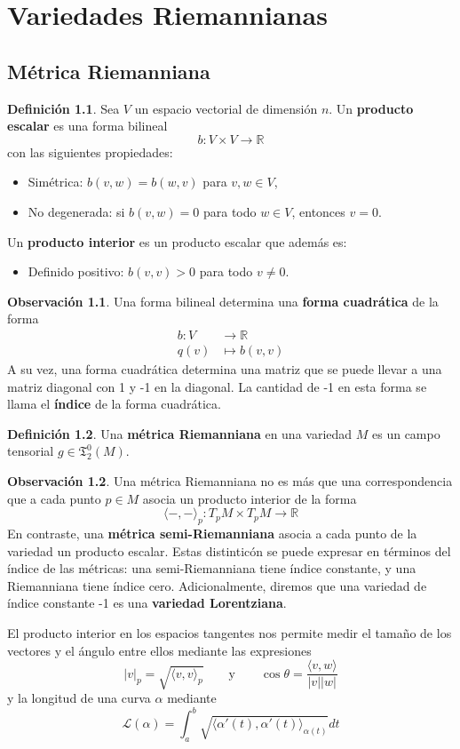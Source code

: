 \documentclass[spanish]{book}
\theoremstyle{definition}
\newtheorem*{defn}{Definición}
\newtheorem*{obs}{Observación}
\newcommand{\R}{\mathbb{R}}
\newcommand{\T}{\mathfrak{T}}
\begin{document}
	\chapter{Variedades Riemannianas}
	\section{Métrica Riemanniana}
	\begin{defn}
		Sea $V$ un espacio vectorial de dimensión $n$. Un \textbf{producto escalar} es una forma bilineal
		\[b:V\times V\to\R\]
		con las siguientes propiedades:
		\begin{itemize}
			\item Simétrica: $b(v,w)=b(w,v)$ para $v,w\in V$,
			\item No degenerada: si $b(v,w)=0$ para todo $w\in V$, entonces $v=0$.
		\end{itemize}
		Un \textbf{producto interior} es un producto escalar que además es:
		\begin{itemize}
			\item Definido positivo: $b(v,v)>0$ para todo $v\neq0$.
		\end{itemize}
	\end{defn}
	\begin{obs}
		Una forma bilineal determina una \textbf{forma cuadrática} de la forma
		\begin{align*}
			b:V&\to\R\\
			q(v)&\mapsto b(v,v)
		\end{align*}
		A su vez, una forma cuadrática determina una matriz que se puede llevar a una matriz diagonal con 1 y -1 en la diagonal. La cantidad de -1 en esta forma se llama el \textbf{índice} de la forma cuadrática.
	\end{obs}
	
	\begin{defn}
		Una \textbf{métrica Riemanniana} en una variedad $M$ es un campo tensorial $g\in\T^0_2(M)$.
	\end{defn}
	\begin{obs}
		Una métrica Riemanniana no es más que una correspondencia que a cada punto $p\in M$ asocia un producto interior de la forma
		\[\langle -,- \rangle_p:T_pM\times T_pM\to\R\]
		En contraste, una \textbf{métrica semi-Riemanniana} asocia a cada punto de la variedad un producto escalar. Estas distinticón se puede expresar en términos del índice de las métricas: una semi-Riemanniana tiene índice constante, y una Riemanniana tiene índice cero. Adicionalmente, diremos que una variedad de índice constante -1 es una \textbf{variedad Lorentziana}.
	\end{obs}
	El producto interior en los espacios tangentes nos permite medir el tamaño de los vectores y el ángulo entre ellos mediante las expresiones
	\[|v|_p=\sqrt{\langle v,v\rangle_p}\qquad\text{y}\qquad\cos\theta=\frac{\langle v,w\rangle}{|v||w|}\]
	y la longitud de una curva $\alpha$ mediante
	\[\mathcal{L}(\alpha)=\int_a^b\sqrt{\langle\alpha'(t),\alpha'(t)\rangle_{\alpha(t)}}dt\]
	
\end{document}

